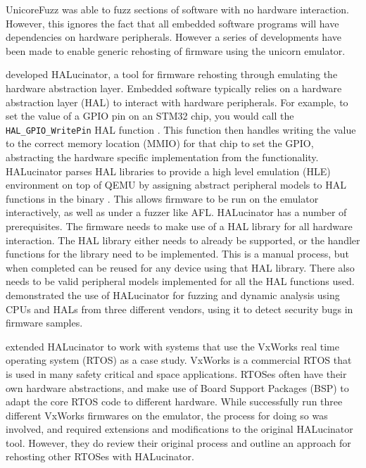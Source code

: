 \documentclass[../report.tex]{subfiles}
\begin{document}
UnicoreFuzz was able to fuzz sections of software with no hardware interaction.
However, this ignores the fact that all embedded software programs will have
dependencies on hardware peripherals. However a series of developments have
been made to enable generic rehosting of firmware using the unicorn emulator.

\citet{HALucinator_2020} developed HALucinator, a tool for firmware rehosting
through emulating the hardware abstraction layer. Embedded software typically
relies on a hardware abstraction layer (HAL) to interact with hardware
peripherals. For example, to set the value of a GPIO pin on an STM32 chip, you
would call the \lstinline{HAL_GPIO_WritePin} HAL function \citep{stm32hal}.
This function then handles writing the value to the correct memory location
(MMIO) for that chip to set the GPIO, abstracting the hardware specific
implementation from the functionality. HALucinator parses HAL libraries to
provide a high level emulation (HLE) environment on top of QEMU by assigning
abstract peripheral models to HAL functions in the binary
\citep{HALucinator_2020}. This allows firmware to be run on the emulator
interactively, as well as under a fuzzer like AFL. HALucinator has a number of
prerequisites. The firmware needs to make use of a HAL library for all hardware
interaction. The HAL library either needs to already be supported, or the
handler functions for the library need to be implemented. This is a manual
process, but when completed can be reused for any device using that HAL
library. There also needs to be valid peripheral models implemented for all the
HAL functions used. \citet{HALucinator_2020} demonstrated the use of
HALucinator for fuzzing and dynamic analysis using CPUs and HALs from three
different vendors, using it to detect security bugs in firmware samples.

\citet{Clements_2021} extended HALucinator to work with systems that use the
VxWorks real time operating system (RTOS) as a case study. VxWorks is a
commercial RTOS that is used in many safety critical and space applications.
RTOSes often have their own hardware abstractions, and make use of Board
Support Packages (BSP) to adapt the core RTOS code to different hardware.
While \citet{Clements_2021} successfully run three different VxWorks firmwares
on the emulator, the process for doing so was involved, and required extensions
and modifications to the original HALucinator tool. However, they do review
their original process and outline an approach for rehosting other RTOSes with
HALucinator.
\end{document}
